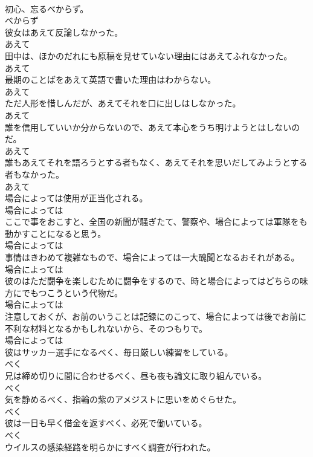 \documentclass[8pt]{extreport}
\begin{document}
\begin{CJK}{UTF8}{min}
\\	初心、忘るべからず。	
\\	べからず
\\	彼女はあえて反論しなかった。	
\\	あえて
\\	田中は、ほかのだれにも原稿を見せていない理由にはあえてふれなかった。	
\\	あえて
\\	最期のことばをあえて英語で書いた理由はわからない。	
\\	あえて
\\	ただ人形を惜しんだが、あえてそれを口に出しはしなかった。	
\\	あえて
\\	誰を信用していいか分からないので、あえて本心をうち明けようとはしないのだ。	
\\	あえて
\\	誰もあえてそれを語ろうとする者もなく、あえてそれを思いだしてみようとする者もなかった。	
\\	あえて
\\	場合によっては使用が正当化される。	
\\	場合によっては
\\	ここで事をおこすと、全国の新聞が騒ぎたて、警察や、場合によっては軍隊をも動かすことになると思う。	
\\	場合によっては
\\	事情はきわめて複雑なもので、場合によっては一大醜聞となるおそれがある。	
\\	場合によっては
\\	彼のはただ闘争を楽しむために闘争をするので、時と場合によってはどちらの味方にでもつこうという代物だ。	
\\	場合によっては
\\	注意しておくが、お前のいうことは記録にのこって、場合によっては後でお前に不利な材料となるかもしれないから、そのつもりで。	
\\	場合によっては
\\	彼はサッカー選手になるべく、毎日厳しい練習をしている。	
\\	べく
\\	兄は締め切りに間に合わせるべく、昼も夜も論文に取り組んでいる。	
\\	べく
\\	気を静めるべく、指輪の紫のアメジストに思いをめぐらせた。	
\\	べく
\\	彼は一日も早く借金を返すべく、必死で働いている。	
\\	べく
\\	ウイルスの感染経路を明らかにすべく調査が行われた。	

\end{CJK}
\end{document}
